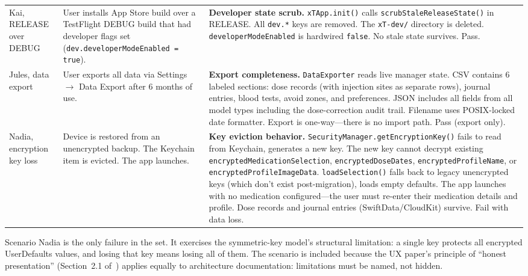 \documentclass[11pt,a4paper]{article}
\newcommand{\bad}[1]{\textcolor{warn}{#1}}
\newcommand{\good}[1]{\textcolor{ok}{#1}}
\newcommand{\code}[1]{\texttt{\small #1}}
\begin{document}
\begin{longtable}{@{}p{2.6cm}p{5.0cm}p{6.9cm}@{}}
Kai, RELEASE over DEBUG &
  User installs App Store build over a TestFlight DEBUG build that had
  developer flags set (\code{dev.developerModeEnabled = true}).
  & \textbf{Developer state scrub.} \code{xTApp.init()} calls
    \code{scrubStaleReleaseState()} in RELEASE. All \code{dev.*} keys are
    removed. The \verb|xT-dev/| directory is deleted.
    \code{developerModeEnabled} is hardwired \code{false}. No stale state
    survives. \good{Pass.} \\[0.4em]

Jules, data export &
  User exports all data via Settings $\to$ Data Export after 6 months of
  use.
  & \textbf{Export completeness.} \code{DataExporter} reads live manager
    state. CSV contains 6 labeled sections: dose records (with injection
    sites as separate rows), journal entries, blood tests, avoid zones, and
    preferences. JSON includes all fields from all model types including
    the dose-correction audit trail. Filename uses POSIX-locked date
    formatter. Export is one-way---there is no import path. \good{Pass
    (export only).} \\[0.4em]

Nadia, encryption key loss &
  Device is restored from an unencrypted backup. The Keychain item is
  evicted. The app launches.
  & \textbf{Key eviction behavior.}
    \code{SecurityManager.getEncryptionKey()} fails to read from Keychain,
    generates a new key. The new key cannot decrypt existing
    \code{encryptedMedicationSelection}, \code{encryptedDoseDates},
    \code{encryptedProfileName}, or \code{encryptedProfileImageData}.
    \code{loadSelection()} falls back to legacy unencrypted keys (which
    don't exist post-migration), loads empty defaults. The app launches
    with no medication configured---the user must re-enter their
    medication details and profile. Dose records and journal entries
    (SwiftData/CloudKit) survive. \bad{Fail with data loss.} \\
\bottomrule
\end{longtable}

Scenario Nadia is the only failure in the set. It exercises the
symmetric-key model's structural limitation: a single key protects all
encrypted UserDefaults values, and losing that key means losing all of them.
The scenario is included because the UX paper's principle of ``honest
presentation'' (Section~2.1 of~\cite{xtux}) applies equally to architecture
documentation: limitations must be named, not hidden.

\end{document}
